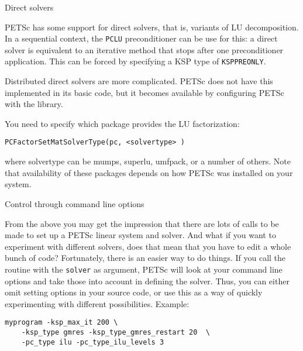  {Direct solvers}
\label{sec:petsc-direct}

PETSc has some support for direct solvers, that is, variants of LU
decomposition. In a sequential context, the \lstinline{PCLU}
preconditioner can be use for this: a direct solver is equivalent to
an iterative method that stops after one preconditioner
application. This can be forced by specifying a KSP type of
\lstinline{KSPPREONLY}.

Distributed direct solvers are more complicated. PETSc does not have
this implemented in its basic code, but it becomes available by
configuring PETSc with the
 library.

You need to specify which package provides the LU factorization:

\begin{lstlisting}
PCFactorSetMatSolverType(pc, <solvertype> )
\end{lstlisting}

where solvertype can be mumps, superlu, umfpack, or a number of
others. Note that availability of these packages depends on how PETSc
was installed on your system.

 {Control through command line options}

From the above you may get the impression that there are lots of calls
to be made to set up a PETSc linear system and solver. And what if you
want to experiment with different solvers, does that mean that you
have to edit a whole bunch of code? Fortunately, there is an easier
way to do things. If you call the routine
%
with the \lstinline{solver} as argument,
%
PETSc will look at your command line options and take those into
account in defining the solver. Thus, you can either omit setting
options in your source code, or use this as a way of quickly
experimenting with different possibilities. Example:

\begin{verbatim}
myprogram -ksp_max_it 200 \
    -ksp_type gmres -ksp_type_gmres_restart 20  \
    -pc_type ilu -pc_type_ilu_levels 3
\end{verbatim}


